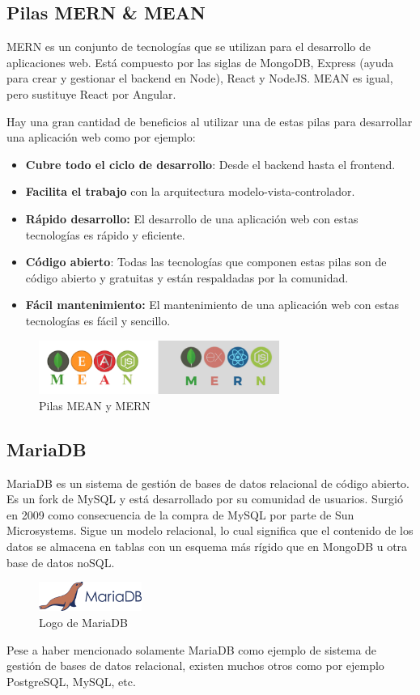 \subsection{Pilas MERN \& MEAN}
MERN es un conjunto de tecnologías que se utilizan para el desarrollo de aplicaciones web. Está compuesto por las siglas de MongoDB, Express (ayuda para crear y gestionar el backend en Node), React y NodeJS. MEAN es igual, pero sustituye React por
Angular. 

Hay una gran cantidad de beneficios al utilizar una de estas pilas para desarrollar una aplicación web como por ejemplo:
\begin{itemize}
\item \textbf{Cubre todo el ciclo de desarrollo}: Desde el backend hasta el frontend.
\item \textbf{Facilita el trabajo} con la arquitectura modelo-vista-controlador.
\item \textbf{Rápido desarrollo:} El desarrollo de una aplicación web con estas tecnologías es rápido y eficiente.
\item \textbf{Código abierto}: Todas las tecnologías que componen estas pilas son de código abierto y gratuitas y están respaldadas por la comunidad.
\item \textbf{Fácil mantenimiento:} El mantenimiento de una aplicación web con estas tecnologías es fácil y sencillo.
\end{itemize}

\begin{figure}[H]
    \centering
    \includegraphics[width=0.7\textwidth]{imagenes/c2/MERN.png}
    \caption{Pilas MEAN y MERN}
\end{figure}

\subsection{MariaDB}
MariaDB es un sistema de gestión de bases de datos relacional de código abierto. Es un fork de MySQL y está desarrollado por su comunidad de usuarios. Surgió en 2009 como
consecuencia de la compra de MySQL por parte de Sun Microsystems.
Sigue un modelo relacional, lo cual significa que el contenido de los datos se almacena en tablas con un esquema más rígido que en MongoDB u otra base de datos noSQL.


\begin{figure}[H]
    \centering
    \includegraphics[width=0.3\textwidth]{imagenes/c2/mariadb.png}
    \caption{Logo de MariaDB}
\end{figure}

Pese a haber mencionado solamente MariaDB como ejemplo de sistema de gestión de bases de datos relacional, existen muchos otros como por ejemplo PostgreSQL, MySQL, etc.


